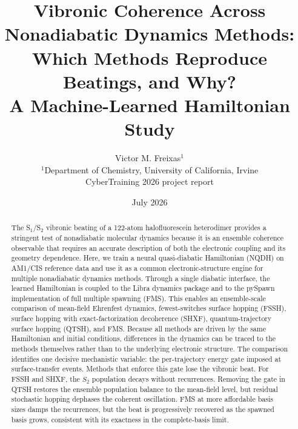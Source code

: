 \documentclass[11pt]{article}
\title{Vibronic Coherence Across Nonadiabatic Dynamics Methods: Which Methods Reproduce Beatings, and Why?\\A Machine-Learned Hamiltonian Study}
\author{Victor M. Freixas$^{1}$ \\[2pt]
\small $^1$Department of Chemistry, University of California, Irvine \\[2pt]
\small CyberTraining 2026 project report}
\date{July 2026}
\begin{document}
\maketitle

\begin{abstract}
The S$_1$/S$_2$ vibronic beating of a 122-atom halofluorescein heterodimer provides a stringent test of nonadiabatic molecular dynamics because it is an ensemble coherence observable that requires an accurate description of both the electronic coupling and its geometry dependence. Here, we train a neural quasi-diabatic Hamiltonian (NQDH) on AM1/CIS reference data and use it as a common electronic-structure engine for multiple nonadiabatic dynamics methods. Through a single diabatic interface, the learned Hamiltonian is coupled to the Libra dynamics package and to the pySpawn implementation of full multiple spawning (FMS). This enables an ensemble-scale comparison of mean-field Ehrenfest dynamics, fewest-switches surface hopping (FSSH), surface hopping with exact-factorization decoherence (SHXF), quantum-trajectory surface hopping (QTSH), and FMS. Because all methods are driven by the same Hamiltonian and initial conditions, differences in the dynamics can be traced to the methods themselves rather than to the underlying electronic structure. The comparison identifies one decisive mechanistic variable: the per-trajectory energy gate imposed at surface-transfer events. Methods that enforce this gate lose the vibronic beat. For FSSH and SHXF, the $S_2$ population decays without recurrences. Removing the gate in QTSH restores the ensemble population balance to the mean-field level, but residual stochastic hopping dephases the coherent oscillation. FMS at more affordable basis sizes damps the recurrences, but the beat is progressively recovered as the spawned basis grows, consistent with its exactness in the complete-basis limit.
\end{abstract}
\end{document}
